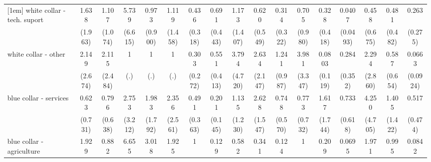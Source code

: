{\begin{tabular}{l*{16}{c}}
[1em]
white collar - tech. suport&       1.638         &       1.107         &       5.739         &       0.973         &       1.119         &       0.436         &       0.691         &       1.173         &       0.620         &       0.314         &       0.705         &       0.328         &      0.0407\sym{**} &       0.458         &       0.481         &       0.263         \\
                    &     (1.963)         &     (1.074)         &     (6.615)         &     (0.900)         &     (1.458)         &     (0.318)         &     (0.443)         &     (1.407)         &     (0.549)         &     (0.322)         &     (0.980)         &     (0.418)         &    (0.0493)         &     (0.675)         &     (0.482)         &     (0.275)         \\
[1em]
white collar - other&       2.149         &       2.115         &           1         &           1         &           1         &       0.303         &       0.551         &       3.794         &       2.634         &       1.241         &       3.981         &      0.0803         &       0.284         &       2.294         &       0.587         &      0.0663         \\
                    &     (2.674)         &     (2.484)         &         (.)         &         (.)         &         (.)         &     (0.272)         &     (0.413)         &     (4.720)         &     (2.147)         &     (0.987)         &     (3.347)         &     (0.119)         &     (0.352)         &     (2.860)         &     (0.654)         &    (0.0924)         \\
[1em]
blue collar - services&       0.623         &       0.796         &       2.753         &       1.983         &       2.356         &       0.491         &       0.201\sym{*}  &       1.135         &       2.628         &       0.748         &       0.773         &       1.617         &       0.733         &       4.250         &       1.405         &       0.517         \\
                    &     (0.731)         &     (0.638)         &     (3.212)         &     (1.792)         &     (2.561)         &     (0.363)         &     (0.145)         &     (1.230)         &     (1.547)         &     (0.570)         &     (0.732)         &     (1.744)         &     (0.618)         &     (4.705)         &     (1.422)         &     (0.474)         \\
[1em]
blue collar - agriculture&       1.929         &       0.882         &       6.655         &       3.018         &       1.925         &           1         &       0.129         &       0.582         &       0.341         &       0.124         &           1         &       0.209         &      0.0695\sym{*}  &       1.971         &       0.995         &      0.0842         \\

\end{tabular}}
